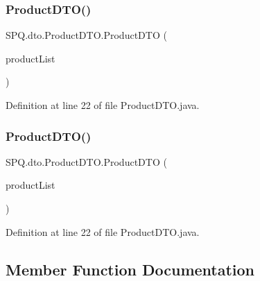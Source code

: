 \subsubsection{\texorpdfstring{Product\+D\+T\+O()}{ProductDTO()}\hspace{0.1cm}{\footnotesize\ttfamily [1/2]}}
{\footnotesize\ttfamily S\+P\+Q.\+dto.\+Product\+D\+T\+O.\+Product\+D\+TO (\begin{DoxyParamCaption}\item[{Array\+List$<$ \mbox{\hyperlink{class_s_p_q_1_1data_1_1_product}{Product}} $>$}]{product\+List }\end{DoxyParamCaption})}



Definition at line 22 of file Product\+D\+T\+O.\+java.

\mbox{\label{class_s_p_q_1_1dto_1_1_product_d_t_o_a206290d64e728a8838485f958bee2c29}} 
\subsubsection{\texorpdfstring{Product\+D\+T\+O()}{ProductDTO()}\hspace{0.1cm}{\footnotesize\ttfamily [2/2]}}
{\footnotesize\ttfamily S\+P\+Q.\+dto.\+Product\+D\+T\+O.\+Product\+D\+TO (\begin{DoxyParamCaption}\item[{Array\+List$<$ \mbox{\hyperlink{class_s_p_q_1_1data_1_1_product}{Product}} $>$}]{product\+List }\end{DoxyParamCaption})}



Definition at line 22 of file Product\+D\+T\+O.\+java.



\subsection{Member Function Documentation}
\mbox{\label{class_s_p_q_1_1dto_1_1_product_d_t_o_a4b7df5983f4342285d495a335fb9019f}} 
